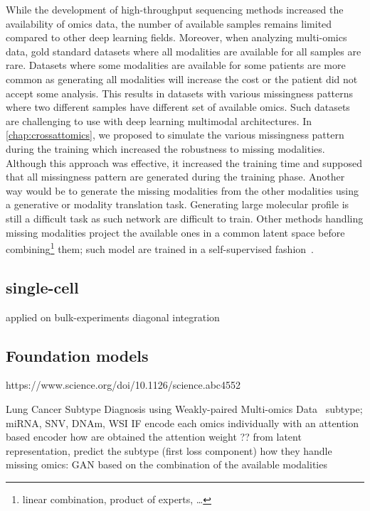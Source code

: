 \documentclass[../main.tex]{subfiles}
\begin{document}
		While the development of high-throughput sequencing methods increased the availability of omics data, the number of available samples remains limited compared to other deep learning fields.
		Moreover, when analyzing multi-omics data, gold standard datasets where all modalities are available for all samples are rare.
		Datasets where some modalities are available for some patients are more common as generating all modalities will increase the cost or the patient did not accept some analysis.
		This results in datasets with various missingness patterns where two different samples have different set of available omics.
		Such datasets are challenging to use with deep learning multimodal architectures.
		In \cref{chap:crossattomics}, we proposed to simulate the various missingness pattern during the training which increased the robustness to missing modalities.
		Although this approach was effective, it increased the training time and supposed that all missingness pattern are generated during the training phase.
		Another way would be to generate the missing modalities from the other modalities using a generative or modality translation task.
		Generating large molecular profile is still a difficult task as such network are difficult to train.
		Other methods handling missing modalities project the available ones in a common latent space before combining\footnote{linear combination, product of experts, \dots} them; such model are trained in a self-supervised fashion~\cite{Lee2021AVI}.

	\subsection{single-cell}
		applied on bulk-experiments
		diagonal integration

	\subsection{Foundation models}

		https://www.science.org/doi/10.1126/science.abc4552

		Lung Cancer Subtype Diagnosis using Weakly-paired Multi-omics Data~\cite{Wang2022}
		subtype; miRNA, SNV, DNAm, WSI
		IF
		encode each omics individually with an attention based encoder
		how are obtained the attention weight ??
		from latent representation, predict the subtype (first loss component)
		how they handle missing omics: GAN based on the combination of the available modalities
\end{document}
